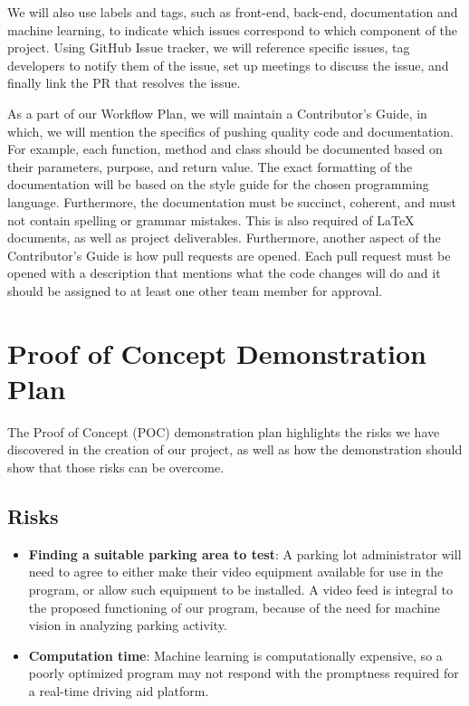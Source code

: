 \documentclass[12pt,letterpaper]{article}
\begin{document}
We will also use labels and tags, such as front-end, back-end, documentation and
machine learning, to indicate which issues correspond to which component of the
project. Using GitHub Issue tracker, we will reference specific issues, tag
developers to notify them of the issue, set up meetings to discuss the issue,
and finally link the PR that resolves the issue.

As a part of our Workflow Plan, we will maintain a Contributor's Guide, in
which, we will mention the specifics of pushing quality code and documentation.
For example, each function, method and class should be documented based on their
parameters, purpose, and return value. The exact formatting of the documentation
will be based on the style guide for the chosen programming language.
Furthermore, the documentation must be succinct, coherent, and must not contain
spelling or grammar mistakes. This is also required of LaTeX documents, as well
as project deliverables. Furthermore, another aspect of the Contributor's Guide
is how pull requests are opened. Each pull request must be opened with a
description that mentions what the code changes will do and it should be
assigned to at least one other team member for approval.

\section{Proof of Concept Demonstration Plan}

The Proof of Concept (POC) demonstration plan highlights the risks we have
discovered in the creation of our project, as well as how the demonstration
should show that those risks can be overcome.

\subsection{Risks}
\begin{itemize}
    \item \textbf{Finding a suitable parking area to test}: A parking lot
    administrator will need to agree to either make their video equipment
    available for use in the program, or allow such equipment to be installed. A
    video feed is integral to the proposed functioning of our program, because
    of the need for machine vision in analyzing parking activity.
    \item \textbf{Computation time}: Machine learning is computationally
    expensive, so a poorly optimized program may not respond with the promptness
    required for a real-time driving aid platform. 
\end{itemize}
\end{document}
